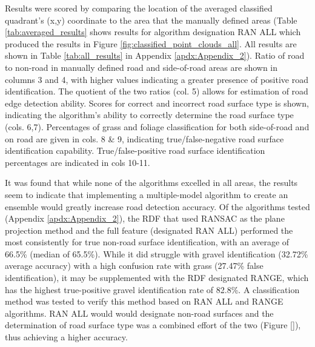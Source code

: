 \documentclass[journal,onecolumn]{IEEEtran}
\begin{document}
	{Results were scored by comparing the location of the averaged classified quadrant's (x,y) coordinate to the area that the manually defined areas (Table \ref{tab:averaged_results} shows results for algorithm designation RAN ALL which produced the results in Figure \ref{fig:classified_point_clouds_all}. All results are shown in Table \ref{tab:all_results} in Appendix \ref{apdx:Appendix_2}). Ratio of road to non-road in manually defined road and side-of-road areas are shown in columns 3 and 4, with higher values indicating a greater presence of positive road identification. The quotient of the two ratios (col. 5) allows for estimation of road edge detection ability. Scores for correct and incorrect road surface type is shown, indicating the algorithm's ability to correctly determine the road surface type (cols. 6,7). Percentages of grass and foliage classification for both side-of-road and on road are given in cols. 8 \& 9, indicating true/false-negative road surface identification capability. True/false-positive road surface identification percentages are indicated in cols 10-11.}

	{It was found that while none of the algorithms excelled in all areas, the results seem to indicate that implementing a multiple-model algorithm to create an ensemble would greatly increase road detection accuracy. Of the algorithms tested (Appendix \ref{apdx:Appendix_2}), the RDF that used RANSAC as the plane projection method and the full feature (designated RAN ALL) performed the most consistently for true non-road surface identification, with an average of 66.5\% (median of 65.5\%). While it did struggle with gravel identification (32.72\% average accuracy) with a high confusion rate with grass (27.47\% false identification), it may be supplemented with the RDF designated RANGE, which has the highest true-positive gravel identification rate of 82.8\%. A classification method was tested to verify this method based on RAN ALL and RANGE algorithms. RAN ALL would would designate non-road surfaces and the determination of road surface type was a combined effort of the two (Figure \ref{}), thus achieving a higher accuracy. }
	
\end{document}
